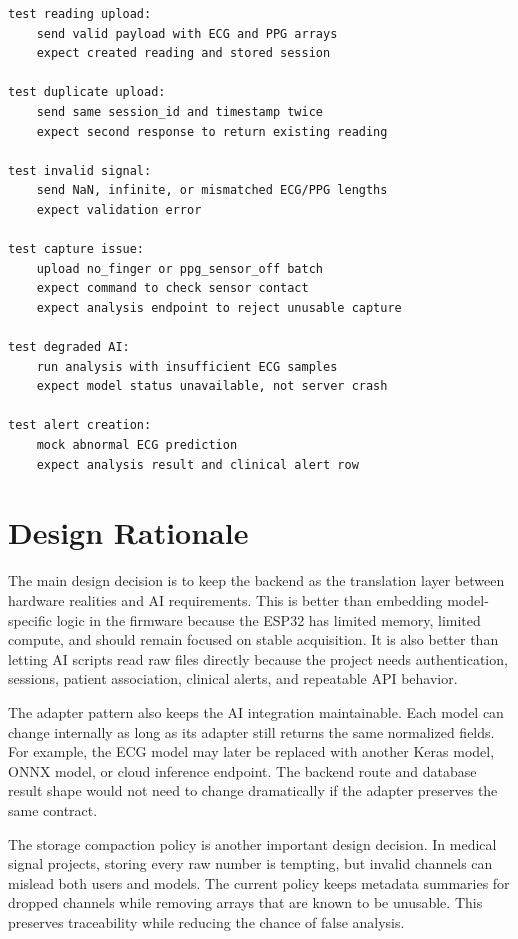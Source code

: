 \begin{lstlisting}[caption={Recommended integration test scenarios}]
test reading upload:
    send valid payload with ECG and PPG arrays
    expect created reading and stored session

test duplicate upload:
    send same session_id and timestamp twice
    expect second response to return existing reading

test invalid signal:
    send NaN, infinite, or mismatched ECG/PPG lengths
    expect validation error

test capture issue:
    upload no_finger or ppg_sensor_off batch
    expect command to check sensor contact
    expect analysis endpoint to reject unusable capture

test degraded AI:
    run analysis with insufficient ECG samples
    expect model status unavailable, not server crash

test alert creation:
    mock abnormal ECG prediction
    expect analysis result and clinical alert row
\end{lstlisting}

\section{Design Rationale}

The main design decision is to keep the backend as the translation layer between hardware realities and AI requirements. This is better than embedding model-specific logic in the firmware because the ESP32 has limited memory, limited compute, and should remain focused on stable acquisition. It is also better than letting AI scripts read raw files directly because the project needs authentication, sessions, patient association, clinical alerts, and repeatable API behavior.

The adapter pattern also keeps the AI integration maintainable. Each model can change internally as long as its adapter still returns the same normalized fields. For example, the ECG model may later be replaced with another Keras model, ONNX model, or cloud inference endpoint. The backend route and database result shape would not need to change dramatically if the adapter preserves the same contract.

The storage compaction policy is another important design decision. In medical signal projects, storing every raw number is tempting, but invalid channels can mislead both users and models. The current policy keeps metadata summaries for dropped channels while removing arrays that are known to be unusable. This preserves traceability while reducing the chance of false analysis.

